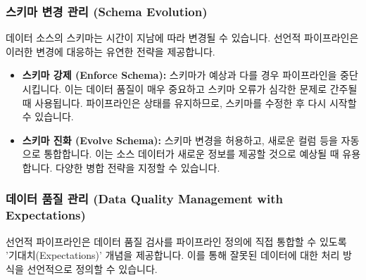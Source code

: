 \documentclass[11pt,a4paper]{article}
\begin{document}
\begin{enumerate}
\subsubsection{스키마 변경 관리 (Schema Evolution)}
데이터 소스의 스키마는 시간이 지남에 따라 변경될 수 있습니다. 선언적 파이프라인은 이러한 변경에 대응하는 유연한 전략을 제공합니다.

\begin{itemize}
    \item \textbf{스키마 강제 (Enforce Schema):} 스키마가 예상과 다를 경우 파이프라인을 중단시킵니다. 이는 데이터 품질이 매우 중요하고 스키마 오류가 심각한 문제로 간주될 때 사용됩니다. 파이프라인은 상태를 유지하므로, 스키마를 수정한 후 다시 시작할 수 있습니다.
    \item \textbf{스키마 진화 (Evolve Schema):} 스키마 변경을 허용하고, 새로운 컬럼 등을 자동으로 통합합니다. 이는 소스 데이터가 새로운 정보를 제공할 것으로 예상될 때 유용합니다. 다양한 병합 전략을 지정할 수 있습니다.
\end{itemize}

\subsubsection{데이터 품질 관리 (Data Quality Management with Expectations)}
선언적 파이프라인은 데이터 품질 검사를 파이프라인 정의에 직접 통합할 수 있도록 '기대치(Expectations)' 개념을 제공합니다. 이를 통해 잘못된 데이터에 대한 처리 방식을 선언적으로 정의할 수 있습니다.


\end{enumerate}
\end{document}
